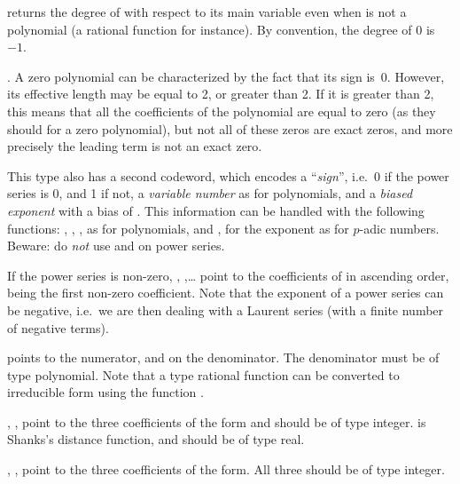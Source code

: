  returns the degree of  with respect to its
main variable even when  is not a polynomial (a rational function
for instance). By convention, the degree of $0$ is~$-1$.

. A zero polynomial can be characterized by the
fact that its sign is~0. However, its effective length may be equal to 2, or
greater than 2. If it is greater than 2, this means that all the coefficients
of the polynomial are equal to zero (as they should for a zero polynomial),
but not all of these zeros are exact zeros, and more precisely the leading
term  is not an exact zero.

 This
type also has a second codeword, which encodes a ``{\it sign\/}'', i.e.~0
if the power series is 0, and 1 if not, a {\it variable number\/} as for
polynomials, and a {\it biased exponent\/} with a bias of
. This information can be handled with the following
functions: , , ,  as for
polynomials, and ,  for the exponent as for $p$-adic
numbers. Beware: do {\it not\/} use  and  on power
series.

If the power series is non-zero, , ,\dots
{} point to the coefficients of  in ascending order,
 being the first non-zero coefficient.  Note that the exponent of a
power series can be negative, i.e.~we are then dealing with a Laurent series
(with a finite number of negative terms).

%
 points to the numerator, and  on the denominator. The
denominator must be of type polynomial. Note that a type 
rational function can be converted to irreducible form using the function
.

%
, ,  point to the three coefficients of the
form and should be of type integer.  is Shanks's distance
function, and should be of type real.

%
, ,  point to the three coefficients of the
form. All three should be of type integer.

